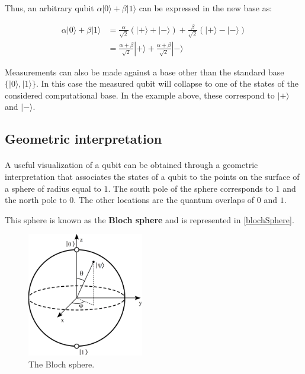 \documentclass[a4paper,10pt]{article}
\begin{document}
Thus, an arbitrary qubit $\alpha|0\rangle + \beta|1\rangle$ can be expressed in the new base as:

\begin{equation*}
\begin{split}
\alpha|0\rangle + \beta|1\rangle & = \frac{\alpha}{\sqrt{2}}(|+\rangle + |-\rangle) + \frac{\beta}{\sqrt{2}}(|+\rangle - |-\rangle) \\
 & = \frac{\alpha+\beta}{\sqrt{2}}|+\rangle + \frac{\alpha+\beta}{\sqrt{2}}|-\rangle
\end{split}
\end{equation*}

Measurements can also be made against a base other than the standard base $\{|0\rangle, |1\rangle\}$. In this case the measured qubit will collapse to one of the states of the considered computational base. In the example above, these correspond to $|+\rangle$ and $|-\rangle$.

\subsection{Geometric interpretation}

\paragraph{} A useful visualization of a qubit can be obtained through a geometric interpretation that associates the states of a qubit to the points on the surface of a sphere of radius equal to $1$. The south pole of the sphere corresponds to $1$ and the north pole to $0$. The other locations are the quantum overlaps of $0$ and $1$.

This sphere is known as the \textbf{Bloch sphere} and is represented in \autoref{blochSphere}.
\begin{figure}[!htb]
\begin{center}
\includegraphics[width=2.0in]{images/blochSphere.png}
\caption{The Bloch sphere.}
\label{blochSphere}
\end{center}
\end{figure}
\end{document}
